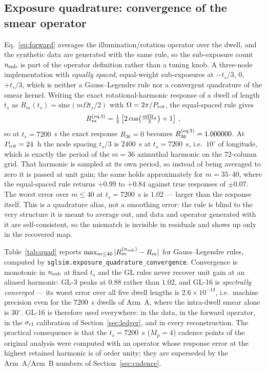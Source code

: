 \documentclass[twocolumn,10pt]{article}
\begin{document}
\subsection{Exposure quadrature: convergence of the smear operator}
\label{sec:quad}
Eq.~\ref{eq:forward} averages the illumination/rotation operator over the
dwell, and the synthetic data are generated with the same rule, so the
sub-exposure count $n_{\rm sub}$ is part of the operator definition rather than
a tuning knob. A three-node implementation with \emph{equally spaced}, equal-weight sub-exposures at
$-t_s/3$, $0$, $+t_s/3$, which is neither a Gauss--Legendre rule nor a convergent
quadrature of the smear kernel. Writing the exact rotational-harmonic response of
a dwell of length $t_s$ as $R_m(t_s)=\mathrm{sinc}(m\Omega t_s/2)$ with
$\Omega=2\pi/P_{\rm rot}$, the equal-spaced rule gives
\begin{equation}
R_{m}^{({\rm eq}\,3)}=\tfrac13\left[2\cos\!\left(\tfrac{m\Omega t_s}{3}\right)+1
\right]\,,
\label{eq:alias}
\end{equation}
so at $t_s=7200$~s the exact response $R_{36}=0$ becomes
$R_{36}^{({\rm eq}\,3)}=1.000000$.
At $P_{\rm rot}=24$~h the node spacing $t_s/3$ is $2400$~s at $t_s=7200$~s,
i.e.\ $10^\circ$ of longitude, which is exactly the period of the $m=36$
azimuthal harmonic on the $72$-column grid. That harmonic is sampled at its own
period, so instead of being averaged to zero it is passed at unit gain; the same
holds approximately for $m=35$--$40$, where the equal-spaced rule returns
$+0.99$ to $+0.84$ against true responses of $\pm0.07$. The worst error over
$m\le40$ at $t_s=7200$~s is $1.02$ --- larger than the response itself. This is a
quadrature alias, not a smoothing error: the rule is blind to the very structure
it is meant to average out, and data and operator generated with it are
self-consistent, so the mismatch is invisible in residuals and shows up only in
the recovered map.

Table~\ref{tab:quad} reports $\max_{m\le40}|R_m^{(n_{\rm sub})}-R_m|$ for
Gauss--Legendre rules, computed by
{\tt sglsim.exposure\_quadrature\_convergence}. Convergence is monotonic in
$n_{\rm sub}$ at fixed $t_s$ and the GL rules never recover unit gain at an
aliased harmonic: GL-3 peaks at $0.88$ rather than $1.02$, and GL-16 is
\emph{spectrally converged} --- its worst error over all five dwell lengths is
$2.6\times10^{-13}$, i.e.\ machine precision even for the 7200~s dwells of
Arm~A, where the intra-dwell smear alone is $30^\circ$. GL-16 is therefore used
everywhere: in the data, in the forward operator, in the $\sigma_{\rm cl}$
calibration of Section~\ref{sec:ledger}, and in every reconstruction. The
practical consequence is that the $t_s=7200$~s ($M_p=4$) cadence points of the
original analysis were computed with an operator whose response error at the
highest retained harmonic is of order unity; they are superseded by the
Arm~A/Arm~B numbers of Section~\ref{sec:cadence}.
\end{document}
